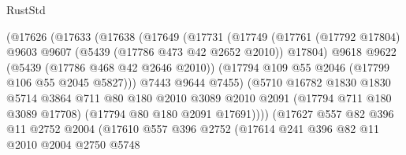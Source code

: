 \begin{lexlean}{RustStd}
\begin{coremodule}
                              (@17626
                                (@17633
                                  (@17638
                                    (@17649
                                      (@17731
                                        (@17749
                                          (@17761
                                            (@17792 @17804)
                                            @9603
                                            @9607
                                            (@5439 (@17786 @473 @42 @2652 @2010))
                                            @17804)
                                          @9618
                                          @9622
                                          (@5439 (@17786 @468 @42 @2646 @2010))
                                          (@17794 @109 @55 @2046 (@17799 @106 @55 @2045 @5827)))
                                        @7443
                                        @9644
                                        @7455)
                                      (@5710
                                        @16782
                                        @1830
                                        @1830
                                        @5714
                                        @3864
                                        @711
                                        @80
                                        @180
                                        @2010
                                        @3089
                                        @2010
                                        @2091
                                        (@17794 @711 @180 @3089 @17708)
                                        (@17794 @80 @180 @2091 @17691))))
                                  (@17627
                                    @557
                                    @82
                                    @396
                                    @11
                                    @2752
                                    @2004
                                    (@17610
                                      @557
                                      @396
                                      @2752
                                      (@17614
                                        @241
                                        @396
                                        @82
                                        @11
                                        @2010
                                        @2004
                                        @2750
                                        @5748

\end{coremodule}
\end{lexlean}
